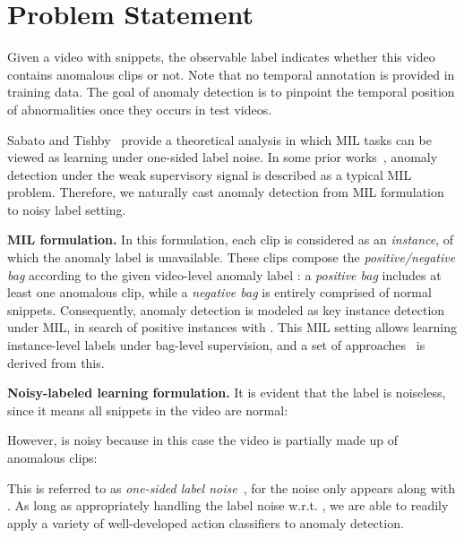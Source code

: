 \documentclass[10pt,twocolumn,letterpaper]{article}
\begin{document}
\section{Problem Statement}\label{sec:problem_statement}
Given a video  with  snippets, the observable label  indicates whether this video contains anomalous clips or not. Note that no temporal annotation is provided in training data. The goal of anomaly detection is to pinpoint the temporal position of abnormalities once they occurs in test videos.

Sabato and Tishby~\cite{Sabato:2012:MLA:2503308.2503338} provide a theoretical analysis in which MIL tasks can be viewed as learning under one-sided label noise. In some prior works~\cite{he2017anomaly,10.1007/978-3-642-32639-4_10,Sultani_2018_CVPR}, anomaly detection under the weak supervisory signal is described as a typical MIL problem. Therefore, we naturally cast anomaly detection from MIL formulation to noisy label setting.

\textbf{MIL formulation.}
In this formulation, each clip  is considered as an \textit{instance}, of which the anomaly label  is unavailable. These clips compose the \textit{positive/negative bag} according to the given video-level anomaly label : a \textit{positive bag}  includes at least one anomalous clip, while a \textit{negative bag}  is entirely comprised of normal snippets. Consequently, anomaly detection is modeled as key instance detection~\cite{liu2012key} under MIL, in search of positive instances  with . This MIL setting allows learning instance-level labels under bag-level supervision, and a set of approaches~\cite{he2017anomaly,10.1007/978-3-642-32639-4_10,Sultani_2018_CVPR} is derived from this.

\textbf{Noisy-labeled learning formulation.}
It is evident that the label  is noiseless, since it means all snippets  in the video  are normal:

However,  is noisy because in this case the video  is partially made up of anomalous clips:

This is referred to as \textit{one-sided label noise}~\cite{Blum1998,CARBONNEAU2018329,pmlr-v30-Scott13}, for the noise only appears along with . As long as appropriately handling the label noise w.r.t. , we are able to readily apply a variety of well-developed action classifiers to anomaly detection.
\end{document}
